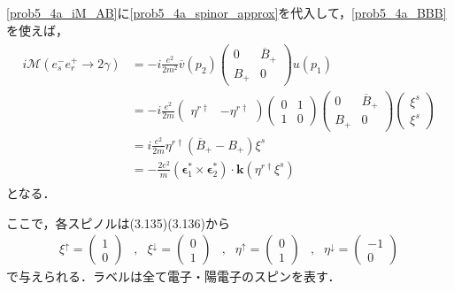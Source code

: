 \eqref{prob5_4a_iM_AB}に\eqref{prob5_4a_spinor_approx}を代入して，\eqref{prob5_4a_BBB}を使えば，
\begin{align}
  \begin{split}
    i\mathcal{M}(e^-_se^+_r \to 2\gamma) &= -i\frac{e^2}{2m^2} \overline{v}(p_2)
    \begin{pmatrix}
      0 & \overline{B}_+ \\
      B_+ & 0
    \end{pmatrix}
    u(p_1) \\
    &= -i\frac{e^2}{2m}
    \begin{pmatrix}
      \eta^{r\dagger} & - \eta^{r\dagger}
    \end{pmatrix}
    \begin{pmatrix}
      0 & 1 \\
      1 & 0
    \end{pmatrix}
    \begin{pmatrix}
      0 & \overline{B}_+ \\
      B_+ & 0
    \end{pmatrix}
    \begin{pmatrix}
      \xi^s \\
      \xi^s
    \end{pmatrix}
    \\
    &= i\frac{e^2}{2m} \eta^{r\dagger} (\overline{B}_+ - B_+) \xi^s \\
    &= - \frac{2e^2}{m} (\boldsymbol{\epsilon}_1^\ast \times \boldsymbol{\epsilon}_2^\ast) \cdot \boldsymbol{k} (\eta^{r\dagger} \xi^s)
  \end{split}
  \label{prob5_4a_iM_cal}
\end{align}
となる．

ここで，各スピノルは(3.135)(3.136)から
\begin{align}
  \xi^\uparrow =
  \begin{pmatrix}
    1 \\
    0
  \end{pmatrix}
  &, &
  \xi^\downarrow =
  \begin{pmatrix}
    0 \\
    1
  \end{pmatrix}
  &, &
  \eta^\uparrow =
  \begin{pmatrix}
    0 \\
    1
  \end{pmatrix}
  &, &
  \eta^\downarrow =
  \begin{pmatrix}
    -1 \\
    0
  \end{pmatrix}
  \label{prob5_4a_spinor}
\end{align}
で与えられる．ラベルは全て電子・陽電子のスピンを表す．

